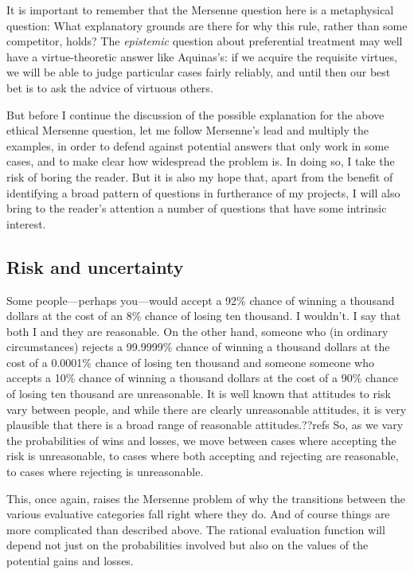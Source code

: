 It is important to remember that the Mersenne question here is a metaphysical question: What explanatory grounds are there for why this
rule, rather than some competitor, holds? The \textit{epistemic} question about preferential treatment may well have a virtue-theoretic answer like Aquinas's: if
we acquire the requisite virtues, we will be able to judge particular cases fairly reliably, and until then our best bet is
to ask the advice of virtuous others.

But before I continue the discussion of the possible explanation for the above ethical Mersenne question, let me follow
Mersenne's lead and multiply the examples, in order to defend against potential answers that only work in some cases, and
to make clear how widespread the problem is. In doing so, I take the risk of boring the reader. But it is also my
hope that, apart from the benefit of identifying a broad pattern of questions in furtherance of my projects, I will 
also bring to the reader's attention a number of questions that have some intrinsic interest.

\subsection{Risk and uncertainty}
Some people---perhaps you---would accept a 92\% chance of winning a thousand dollars at the cost of an 8\% chance
of losing ten thousand. I wouldn't. I say that both I and they are reasonable. On the other hand, someone who 
(in ordinary circumstances) rejects a 99.9999\% chance of winning a thousand dollars at the cost of a 0.0001\% chance
of losing ten thousand and someone someone who accepts a 10\% chance of winning a thousand dollars at the cost of a 90\% chance
of losing ten thousand are unreasonable. 
It is well known that attitudes to risk vary between people, and while there are clearly unreasonable attitudes, it is very plausible
that there is a broad range of reasonable attitudes.??refs
So, as we vary the probabilities of wins and losses, we move between cases
where accepting the risk is unreasonable, to cases where both accepting and rejecting are reasonable, to cases where
rejecting is unreasonable.

This, once again, raises the Mersenne problem of why the transitions between the various evaluative categories fall right where they
do.  And of course things are more complicated than described above. The rational evaluation function will depend not just
on the probabilities involved but also on the values of the potential gains and losses. 

